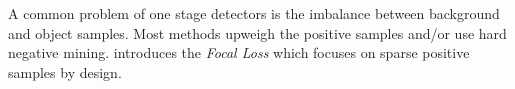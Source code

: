 \documentclass{article}
\begin{document}
A common problem of one stage detectors is the imbalance between background and object samples. Most methods upweigh the positive samples and/or use hard negative mining. \cite{Lin} introduces the \textit{Focal Loss} which focuses on sparse positive samples by design.








\end{document}
